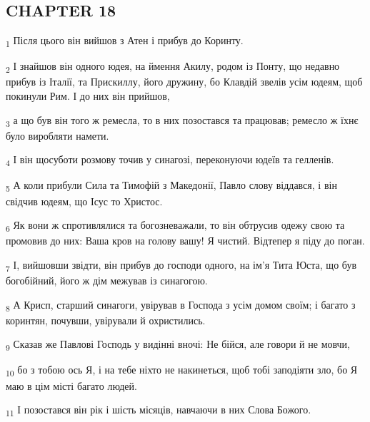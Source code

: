 \subsection{CHAPTER 18}
\begin{tcolorbox}
\textsubscript{1} Після цього він вийшов з Атен і прибув до Коринту.
\end{tcolorbox}
\begin{tcolorbox}
\textsubscript{2} І знайшов він одного юдея, на ймення Акилу, родом із Понту, що недавно прибув із Італії, та Прискиллу, його дружину, бо Клавдій звелів усім юдеям, щоб покинули Рим. І до них він прийшов,
\end{tcolorbox}
\begin{tcolorbox}
\textsubscript{3} а що був він того ж ремесла, то в них позостався та працював; ремесло ж їхнє було виробляти намети.
\end{tcolorbox}
\begin{tcolorbox}
\textsubscript{4} І він щосуботи розмову точив у синагозі, переконуючи юдеїв та гелленів.
\end{tcolorbox}
\begin{tcolorbox}
\textsubscript{5} А коли прибули Сила та Тимофій з Македонії, Павло слову віддався, і він свідчив юдеям, що Ісус то Христос.
\end{tcolorbox}
\begin{tcolorbox}
\textsubscript{6} Як вони ж спротивлялися та богозневажали, то він обтрусив одежу свою та промовив до них: Ваша кров на голову вашу! Я чистий. Відтепер я піду до поган.
\end{tcolorbox}
\begin{tcolorbox}
\textsubscript{7} І, вийшовши звідти, він прибув до господи одного, на ім'я Тита Юста, що був богобійний, його ж дім межував із синагогою.
\end{tcolorbox}
\begin{tcolorbox}
\textsubscript{8} А Крисп, старший синагоги, увірував в Господа з усім домом своїм; і багато з коринтян, почувши, увірували й охристились.
\end{tcolorbox}
\begin{tcolorbox}
\textsubscript{9} Сказав же Павлові Господь у видінні вночі: Не бійся, але говори й не мовчи,
\end{tcolorbox}
\begin{tcolorbox}
\textsubscript{10} бо з тобою ось Я, і на тебе ніхто не накинеться, щоб тобі заподіяти зло, бо Я маю в цім місті багато людей.
\end{tcolorbox}
\begin{tcolorbox}
\textsubscript{11} І позостався він рік і шість місяців, навчаючи в них Слова Божого.
\end{tcolorbox}
